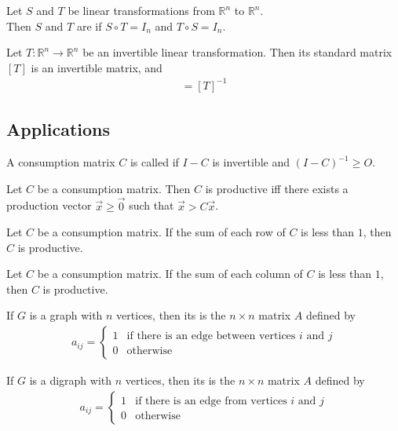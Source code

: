 \documentclass{article}
\begin{document}
\begin{definition}
    Let $S$ and $T$ be linear transformations from $\mathbb{R}^n$ to $\mathbb{R}^n$.\\ 
    Then $S$ and $T$ are  if $S\circ T= I_n$ and $T\circ S=I_n$.
\end{definition}
\begin{theorem}
    Let $T:\mathbb{R}^n\to\mathbb{R}^n$ be an invertible linear transformation. Then its standard matrix $[T]$ is an invertible matrix, and
    \begin{gather*}
        [T^{-1}] = [T]^{-1}
    \end{gather*}
\end{theorem}
\subsection{Applications}
\begin{definition}
    A consumption matrix $C$ is called  if $I-C$ is invertible and $(I-C)^{-1}\geq O$.
\end{definition}
\begin{theorem}
    Let $C$ be a consumption matrix. Then $C$ is productive iff there exists a production vector $\vec x \geq \vec 0$ such that $\vec x > C\vec x$.
\end{theorem}
\begin{theorem}
    Let $C$ be a consumption matrix. If the sum of each row of $C$ is less than $1$, then $C$ is productive.
\end{theorem}
\begin{theorem}
    Let $C$ be a consumption matrix. If the sum of each column of $C$ is less than $1$, then $C$ is productive.
\end{theorem}
\begin{definition}
    If $G$ is a graph with $n$ vertices, then its  is the $n\times n$ matrix $A$ defined by
    \begin{gather*}
        a_{ij} = \begin{cases}
            1 &\text{if there is an edge between vertices $i$ and $j$}\\
            0 &\text{otherwise}
        \end{cases}
    \end{gather*}
\end{definition}
\begin{definition}
    If $G$ is a digraph with $n$ vertices, then its  is the $n\times n$ matrix $A$ defined by
    \begin{gather*}
        a_{ij} = \begin{cases}
            1 &\text{if there is an edge from vertices $i$ and $j$}\\
            0 &\text{otherwise}
        \end{cases}
    \end{gather*}
\end{definition}
\end{document}
